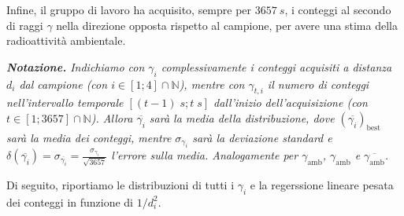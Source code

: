 \documentclass{article}
\newcommand*{\bestp}[1]{{\left(#1\right)}_\text{best}}
\begin{document}
Infine, il gruppo di lavoro ha acquisito, sempre per $\qty{3657}{s}$,
i conteggi al secondo di raggi $\gamma$ nella direzione opposta rispetto
al campione,
per avere una stima della radioattività ambientale.

\emph{
    \textbf{Notazione.} Indichiamo con $\gamma_i$ complessivamente i conteggi
    acquisiti a distanza $d_i$ dal campione (con $i\in\left[1;4\right]\cap\mathbb{N}$),
    mentre con $\gamma_{t,i}$ il numero di conteggi nell'intervallo temporale
    $\left[(t-1)\;\unit{s};t\;\unit{s}\right]$ dall'inizio dell'acquisizione (con
    $t\in\left[1;3657\right]\cap\mathbb{N}$).
    Allora $\overline{\gamma_i}$ sarà la media della distribuzione, dove
    $\bestp{\overline{\gamma_i}}$ sarà la media dei conteggi,
    mentre $\sigma_{\gamma_i}$ sarà la deviazione standard e
    $
        \delta\!\left(\overline{\gamma_i}\right) =
        \sigma_{\overline{\gamma_i}} =
        \frac{\sigma_{\gamma_i}}{\sqrt{3657}}
    $
    l'errore sulla media.
    Analogamente per \emph{
        $\gamma_\text{amb}$,
        $\gamma_\text{amb}$ e
        $\overline{\gamma_\text{amb}}$.
    }
}

Di seguito, riportiamo le distribuzioni di tutti i $\gamma_i$
e la regerssione lineare pesata dei conteggi in funzione di $1/d_i^2$.
\end{document}
